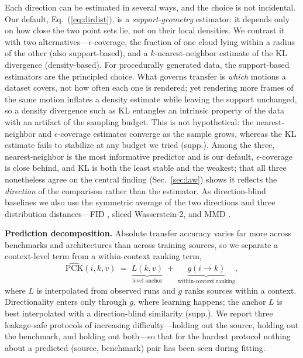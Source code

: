 \documentclass[runningheads]{llncs}
\newcommand{\pck}{PCK}
\begin{document}
Each direction can be estimated in several ways, and the choice is not
incidental. Our default, Eq.~(\ref{eq:dirdist}), is a \emph{support-geometry}
estimator: it depends only on how close the two point sets lie, not on their
local densities. We contrast it with two alternatives---$\epsilon$-coverage,
the fraction of one cloud lying within a radius of the other (also
support-based), and a $k$-nearest-neighbor estimate of the KL divergence
(density-based). For procedurally generated data, the support-based estimators
are the principled choice. What governs transfer is \emph{which} motions a
dataset covers, not how often each one is rendered; yet rendering more frames
of the same motion inflates a density estimate while leaving the support
unchanged, so a density divergence such as KL entangles an intrinsic property
of the data with an artifact of the sampling budget. This is not hypothetical:
the nearest-neighbor and $\epsilon$-coverage estimates converge as the sample
grows, whereas the KL estimate fails to stabilize at any budget we tried
(supp.). Among the three, nearest-neighbor is the most informative predictor
and is our default, $\epsilon$-coverage is close behind, and KL is both the
least stable and the weakest; that all three nonetheless agree on the central
finding (Sec.~\ref{sec:law}) shows it reflects the \emph{direction} of the
comparison rather than the estimator. As direction-blind baselines we also use
the symmetric average of the two directions and three distribution
distances---FID \cite{heusel2018ganstrainedtimescaleupdate}, sliced
Wasserstein-2, and MMD \cite{gretton2008kernelmethodtwosampleproblem}.

\noindent\textbf{Prediction decomposition.}
Absolute transfer accuracy varies far more across benchmarks and architectures
than across training sources, so we separate a context-level term from a
within-context ranking term,
\begin{equation}
\widehat{\text{\pck}}(i,k,v) \;=\; \underbrace{L(k,v)}_{\text{level anchor}}
\;+\; \underbrace{g(i \to k)}_{\text{within-context ranking}},
\label{eq:decomp}
\end{equation}
where $L$ is interpolated from observed runs and $g$ ranks sources within a
context. Directionality enters only through $g$, where learning happens; the
anchor $L$ is best interpolated with a direction-blind similarity (supp.). We
report three leakage-safe protocols of increasing difficulty---holding out the
source, holding out the benchmark, and holding out both---so that for the
hardest protocol nothing about a predicted (source, benchmark) pair has been
seen during fitting.
\end{document}
